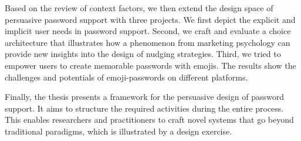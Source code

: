 Based on the review of context factors, we then extend the design space of persuasive password support with three projects. We first depict the explicit and implicit user needs in password support. Second, we craft and evaluate a choice architecture that illustrates how a phenomenon from marketing psychology can provide new insights into the design of nudging strategies. Third, we tried to empower users to create memorable passwords with emojis. The results show the challenges and potentials of emoji-passwords on different platforms. 

Finally, the thesis presents a framework for the persuasive design of password support. It aims to structure the required activities during the entire process. This enables researchers and practitioners to craft novel systems that go beyond traditional paradigms, which is illustrated by a design exercise.%

%
%
\clearpage

